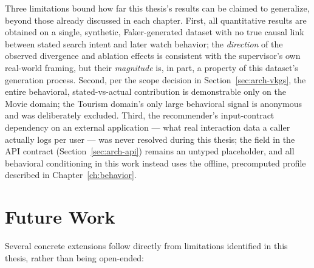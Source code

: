 Three limitations bound how far this thesis's results can be claimed to generalize, beyond those
already discussed in each chapter. First, all quantitative results are obtained on a single,
synthetic, Faker-generated dataset with no true causal link between stated search intent and later
watch behavior; the \emph{direction} of the observed divergence and ablation effects is consistent
with the supervisor's own real-world framing, but their \emph{magnitude} is, in part, a property of
this dataset's generation process. Second, per the scope decision in
Section~\ref{sec:arch-vkgs}, the entire behavioral, stated-vs-actual contribution is demonstrable
only on the Movie domain; the Tourism domain's only large behavioral signal is anonymous and was
deliberately excluded. Third, the recommender's input-contract dependency on an external
application --- what real interaction data a caller actually logs per user --- was never resolved
during this thesis; the  field in the API contract
(Section~\ref{sec:arch-api}) remains an untyped placeholder, and all behavioral conditioning in this
work instead uses the offline, precomputed profile described in Chapter~\ref{ch:behavior}.

\section{Future Work}
\label{sec:conclusion-future}

Several concrete extensions follow directly from limitations identified in this thesis, rather than
being open-ended:

